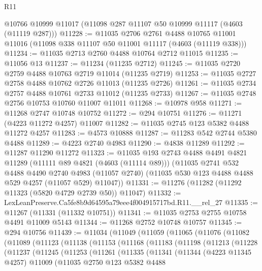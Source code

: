 \begin{lexlean}{R11}
\begin{coremodule}
    @10766
    @10999
    @11017
    (@11098 @287 @11107 @50 @10999 @11117 (@4603 (@11119 @287)))
@11228 := @11035
    @2706
    @2761
    @4488
    @10765
    @11001
    @11016
    (@11098 @338 @11107 @50 @11001 @11117 (@4603 (@11119 @338)))
@11234 := @11035 @2713 @2760 @4488 @10764 @2712 @11015
@11235 := @11056 @13
@11237 := @11234 (@11235 @2712)
@11245 := @11035 @2720 @2759 @4488 @10763 @2719 @11014 (@11235 @2719)
@11253 := @11035 @2727 @2758 @4488 @10762 @2726 @11013 (@11235 @2726)
@11261 := @11035 @2734 @2757 @4488 @10761 @2733 @11012 (@11235 @2733)
@11267 := @11035 @2748 @2756 @10753 @10760 @11007 @11011
@11268 := @10978 @958
@11271 := @11268 @2747 @10748 @10752
@11272 := @294 @10751
@11276 := @11271 (@4223 @11272 @4257) @11007
@11282 := @11035 @2745 @123 @5382 @4488 @11272 @4257
@11283 := @4573 @10888
@11287 := @11283 @542 @2744 @5380 @4488
@11289 := @4223 @2740 @4983
@11290 := @4838 @11289
@11292 := @11287 @11290 @11272
@11323 := @11035
    @193
    @2743
    @4488
    @4491
    @4821
    @11289
    (@11111 @89 @4821 (@4603 (@11114 @89)))
    (@11035
      @2741
      @532
      @4488
      @4490
      @2740
      @4983
      (@11057 @2740)
      (@11035 @530 @123 @4488 @4488 @529 @4257 (@11057 @529) @11047))
@11331 := @11276 (@11282 (@11292 @11323 (@5820 @4729 @2739 @50)) @11047)
@11332 := LexLeanPreserve.Ca5fe8b9d64595a79eee4f004915717bd.R11.__rel_27
@11335 := @11267 (@11331 (@11332 @10751))
@11341 := @11035 @2753 @2755 @10758 @4491 @11009 @5143
@11344 := @11268 @2752 @10748 @10757
@11345 := @294 @10756
@11439 := @11034
    (@11049
      (@11059
        (@11065
          (@11076
            (@11082
              (@11089
                (@11123
                  (@11138
                    (@11153
                      (@11168
                        (@11183
                          (@11198
                            (@11213
                              (@11228
                                (@11237
                                  (@11245
                                    (@11253
                                      (@11261
                                        (@11335
                                          (@11341
                                            (@11344
                                              (@4223 @11345 @4257)
                                              @11009
                                              (@11035
                                                @2750
                                                @123
                                                @5382
                                                @4488

\end{coremodule}
\end{lexlean}

